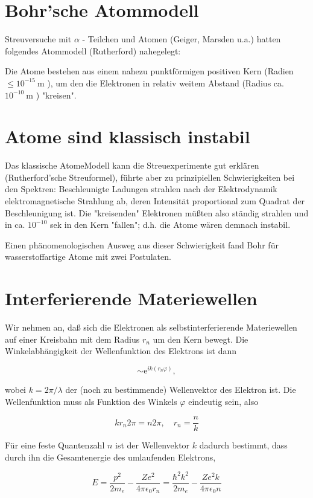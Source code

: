 \documentclass[10pt, letterpaper]{article}
\begin{document}
\section*{Bohr'sche Atommodell}
Streuversuche mit $\alpha$ - Teilchen und Atomen (Geiger, Marsden u.a.) hatten folgendes Atommodell (Rutherford) nahegelegt:

Die Atome bestehen aus einem nahezu punktförmigen positiven Kern (Radien $\leq 10^{-15} \mathrm{~m}$ ), um den die Elektronen in relativ weitem Abstand (Radius ca. $10^{-10} \mathrm{~m}$ ) "kreisen".

\section*{Atome sind klassisch instabil}
Das klassische AtomeModell kann die Streuexperimente gut erklären (Rutherford'sche Streuformel), führte aber zu prinzipiellen Schwierigkeiten bei den Spektren: Beschleunigte Ladungen strahlen nach der Elektrodynamik elektromagnetische Strahlung ab, deren Intensität proportional zum Quadrat der Beschleunigung ist. Die "kreisenden" Elektronen müßten also ständig strahlen und in ca. $10^{-10}$ sek in den Kern "fallen"; d.h. die Atome wären demnach instabil.

Einen phänomenologischen Ausweg aus dieser Schwierigkeit fand Bohr für wasserstoffartige Atome mit zwei Postulaten.

\section*{Interferierende Materiewellen}
Wir nehmen an, daß sich die Elektronen als selbstinterferierende Materiewellen auf einer Kreisbahn mit dem Radius $r_{n}$ um den Kern bewegt. Die Winkelabhängigkeit der Wellenfunktion des Elektrons ist dann

$$
\sim \mathrm{e}^{i k\left(r_{n} \varphi\right)},
$$

wobei $k=2 \pi / \lambda$ der (noch zu bestimmende) Wellenvektor des Elektron ist. Die Wellenfunktion muss als Funktion des Winkels $\varphi$ eindeutig sein, also

$$
k r_{n} 2 \pi=n 2 \pi, \quad r_{n}=\frac{n}{k}
$$

Für eine feste Quantenzahl $n$ ist der Wellenvektor $k$ dadurch bestimmt, dass durch ihn die Gesamtenergie des umlaufenden Elektrons,

$$
E=\frac{p^{2}}{2 m_{e}}-\frac{Z e^{2}}{4 \pi \epsilon_{0} r_{n}}=\frac{\hbar^{2} k^{2}}{2 m_{e}}-\frac{Z e^{2} k}{4 \pi \epsilon_{0} n}
$$
\end{document}
